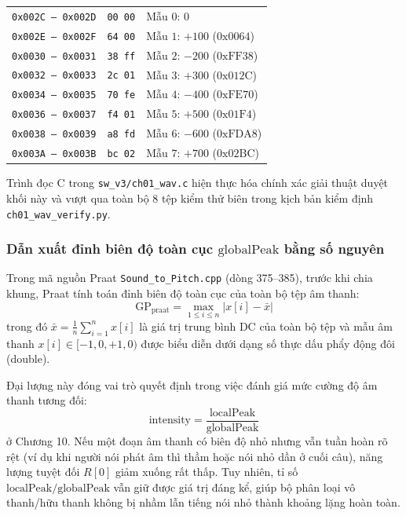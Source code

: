 \begin{center}
\begin{tabular}{lll}
\texttt{0x002C -- 0x002D} & \texttt{00 00} & Mẫu $0$: $0$ \\
\texttt{0x002E -- 0x002F} & \texttt{64 00} & Mẫu $1$: $+100$ ($0\text{x}0064$) \\
\texttt{0x0030 -- 0x0031} & \texttt{38 ff} & Mẫu $2$: $-200$ ($0\text{xFF38}$) \\
\texttt{0x0032 -- 0x0033} & \texttt{2c 01} & Mẫu $3$: $+300$ ($0\text{x}012\text{C}$) \\
\texttt{0x0034 -- 0x0035} & \texttt{70 fe} & Mẫu $4$: $-400$ ($0\text{xFE70}$) \\
\texttt{0x0036 -- 0x0037} & \texttt{f4 01} & Mẫu $5$: $+500$ ($0\text{x}01\text{F}4$) \\
\texttt{0x0038 -- 0x0039} & \texttt{a8 fd} & Mẫu $6$: $-600$ ($0\text{xFDA8}$) \\
\texttt{0x003A -- 0x003B} & \texttt{bc 02} & Mẫu $7$: $+700$ ($0\text{x}02\text{BC}$) \\
\bottomrule
\end{tabular}
\end{center}
Trình đọc C trong \texttt{sw\_v3/ch01\_wav.c} hiện thực hóa chính xác giải thuật duyệt khối này và vượt qua toàn bộ 8 tệp kiểm thử biên trong kịch bản kiểm định \texttt{ch01\_wav\_verify.py}.

\subsubsection*{Dẫn xuất đỉnh biên độ toàn cục $\text{globalPeak}$ bằng số nguyên}
Trong mã nguồn Praat \texttt{Sound\_to\_Pitch.cpp} (dòng 375--385), trước khi chia khung, Praat tính toán đỉnh biên độ toàn cục của toàn bộ tệp âm thanh:
\begin{equation}
\text{GP}_{\text{praat}} = \max_{1 \le i \le n} |x[i] - \bar{x}|
\end{equation}
trong đó $\bar{x} = \frac{1}{n} \sum_{i=1}^n x[i]$ là giá trị trung bình DC của toàn bộ tệp và mẫu âm thanh $x[i] \in [-1{,}0, +1{,}0)$ được biểu diễn dưới dạng số thực dấu phẩy động đôi (double).

Đại lượng này đóng vai trò quyết định trong việc đánh giá mức cường độ âm thanh tương đối:
\begin{equation}
\text{intensity} = \frac{\text{localPeak}}{\text{globalPeak}}
\end{equation}
ở Chương 10. Nếu một đoạn âm thanh có biên độ nhỏ nhưng vẫn tuần hoàn rõ rệt (ví dụ khi người nói phát âm thì thầm hoặc nói nhỏ dần ở cuối câu), năng lượng tuyệt đối $R[0]$ giảm xuống rất thấp. Tuy nhiên, tỉ số $\text{localPeak} / \text{globalPeak}$ vẫn giữ được giá trị đáng kể, giúp bộ phân loại vô thanh/hữu thanh không bị nhầm lẫn tiếng nói nhỏ thành khoảng lặng hoàn toàn.

